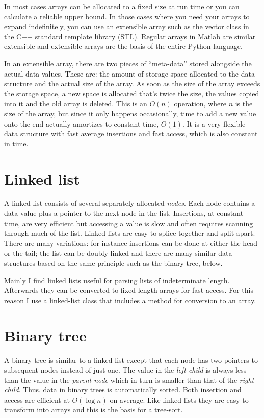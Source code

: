 \documentclass{article}
\begin{document}
In most cases arrays can be allocated to a fixed size at run time or you can
calculate a reliable upper bound.
In those cases where you need your arrays to expand indefinitely, you can use 
an extensible array such as the vector class in the C++ standard template 
library (STL).
Regular arrays in Matlab are similar extensible and extensible arrays are the
basis of the entire Python language.

In an extensible array, there are two pieces of ``meta-data'' stored alongside
the actual data values. These are: the amount of storage space allocated to
the data structure and the actual size of the array.
As soon as the size of the array exceeds the storage space, a new space is
allocated that's twice the size, the values copied into it and the old array
is deleted.
This is an $O(n)$ operation, where $n$ is the size of the array, but since it
only happens occasionally, time to add a new value onto the end actually
amortizes to constant time, $O(1)$. It is a very flexible data structure with
fast average insertions and fast access, which is also constant in time.

\section{Linked list}

A linked list consists of several separately allocated {\it nodes}.
Each node contains a data value plus a pointer to the next node in the list.
Insertions, at constant time, are very efficient but accessing a value is
slow and often requires scanning through much of the list.
Linked lists are easy to splice together and split apart.
There are many variations: for instance insertions can be done at either 
the head or the tail; the list can be doubly-linked and there are many
similar data structures based on the same principle such as the 
binary tree, below.

Mainly I find linked lists useful for parsing lists of indeterminate length.
Afterwards they can be converted to fixed-length arrays for fast access.
For this reason I use a linked-list class that includes a method for conversion
to an array.

\section{Binary tree}

A binary tree is similar to a linked list except that each node has two 
pointers to subsequent nodes instead of just one.
The value in the {\it left child} is always less than the value in the 
{\it parent node} which in turn is smaller than that of the {\it right child}.
Thus, data in binary trees is automatically sorted.
Both insertion and access are efficient at $O(\log n)$ on average.
Like linked-lists they are easy to transform into arrays and this is the basis
for a tree-sort.
\end{document}
